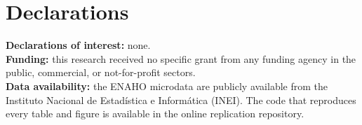 \documentclass[12pt]{article}
\begin{document}
\section*{Declarations}
\noindent\textbf{Declarations of interest:} none.\\
\textbf{Funding:} this research received no specific grant from any funding agency in the
public, commercial, or not-for-profit sectors.\\
\textbf{Data availability:} the ENAHO microdata are publicly available from the Instituto
Nacional de Estadística e Informática (INEI). The code that reproduces every table and
figure is available in the online replication repository.

\newpage


\newpage
\appendix

\end{document}
